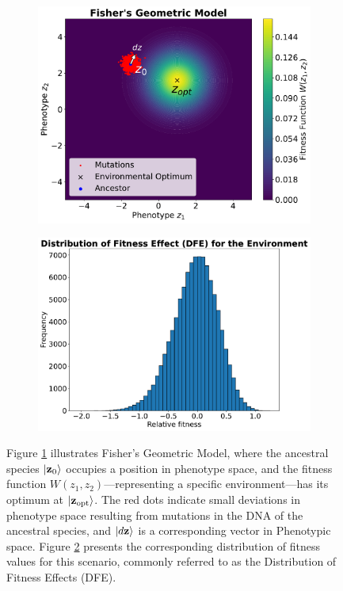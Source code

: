 \documentclass[11pt]{article}
\begin{document}
\begin{figure}
\begin{subfigure}{.5\textwidth}
  \includegraphics[width=0.90\linewidth]{Fisher_geometric_model.pdf}
  \caption{}
  \label{fig:sfig2a}
\end{subfigure}%
\begin{subfigure}{.5\textwidth}
  \includegraphics[width=1\linewidth]{DFEs.pdf}
  \caption{}
  \label{fig:sfig2b}
\end{subfigure}
\caption{Figure \ref{fig:sfig2a} illustrates Fisher's Geometric Model, where the ancestral species $\ket{\mathbf{z}_0}$ occupies a position in phenotype space, and the fitness function $W(z_1, z_2)$—representing a specific environment—has its optimum at $\ket{\mathbf{z}_\mathrm{opt}}$.  The red dots indicate small deviations in phenotype space resulting from mutations in the DNA of the ancestral species, and $\ket{d\mathbf{z}}$ is a corresponding vector in Phenotypic space. Figure \ref{fig:sfig2b} presents the corresponding distribution of fitness values for this scenario, commonly referred to as the Distribution of Fitness Effects (DFE). }
\label{fig:fig2}
\end{figure}
\end{document}
